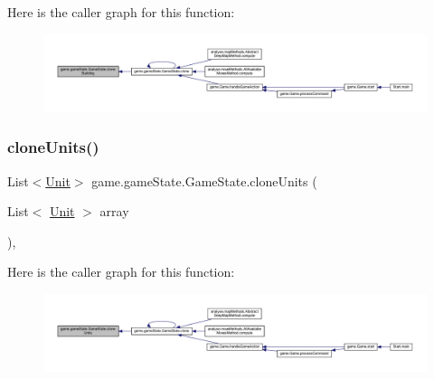 Here is the caller graph for this function\+:
\nopagebreak
\begin{figure}[H]
\begin{center}
\leavevmode
\includegraphics[width=350pt]{classgame_1_1game_state_1_1_game_state_a9acfa671516164070b06cb8f94be79fa_icgraph}
\end{center}
\end{figure}
\mbox{\label{classgame_1_1game_state_1_1_game_state_ae1661eac863f6e53722801714ad31103}} 
\subsubsection{\texorpdfstring{clone\+Units()}{cloneUnits()}}
{\footnotesize\ttfamily List$<$\mbox{\hyperlink{classgame_1_1board_1_1_unit}{Unit}}$>$ game.\+game\+State.\+Game\+State.\+clone\+Units (\begin{DoxyParamCaption}\item[{List$<$ \mbox{\hyperlink{classgame_1_1board_1_1_unit}{Unit}} $>$}]{array }\end{DoxyParamCaption})\hspace{0.3cm}{\ttfamily [inline]}, {\ttfamily [private]}}

Here is the caller graph for this function\+:
\nopagebreak
\begin{figure}[H]
\begin{center}
\leavevmode
\includegraphics[width=350pt]{classgame_1_1game_state_1_1_game_state_ae1661eac863f6e53722801714ad31103_icgraph}
\end{center}
\end{figure}
\mbox{\label{classgame_1_1game_state_1_1_game_state_ab098a3f062ba9ad6eddc030911d85506}} 

